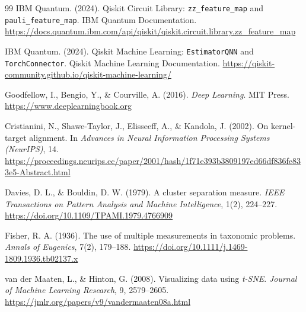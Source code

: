 \begin{thebibliography}{99}
    IBM Quantum. (2024). Qiskit Circuit Library: \texttt{zz\_feature\_map} and \texttt{pauli\_feature\_map}. IBM Quantum Documentation. \url{https://docs.quantum.ibm.com/api/qiskit/qiskit.circuit.library.zz_feature_map}

    IBM Quantum. (2024). Qiskit Machine Learning: \texttt{EstimatorQNN} and \texttt{TorchConnector}. Qiskit Machine Learning Documentation. \url{https://qiskit-community.github.io/qiskit-machine-learning/}

    Goodfellow, I., Bengio, Y., \& Courville, A. (2016). \textit{Deep Learning}. MIT Press.
    \url{https://www.deeplearningbook.org}

    Cristianini, N., Shawe-Taylor, J., Elisseeff, A., \& Kandola, J. (2002). On kernel-target alignment.
    In \textit{Advances in Neural Information Processing Systems (NeurIPS)}, 14.
    \url{https://proceedings.neurips.cc/paper/2001/hash/1f71e393b3809197ed66df836fe833e5-Abstract.html}

    Davies, D. L., \& Bouldin, D. W. (1979). A cluster separation measure.
    \textit{IEEE Transactions on Pattern Analysis and Machine Intelligence}, 1(2), 224--227.
    \url{https://doi.org/10.1109/TPAMI.1979.4766909}

    Fisher, R. A. (1936). The use of multiple measurements in taxonomic problems.
    \textit{Annals of Eugenics}, 7(2), 179--188.
    \url{https://doi.org/10.1111/j.1469-1809.1936.tb02137.x}

    van der Maaten, L., \& Hinton, G. (2008). Visualizing data using \textit{t-SNE}.
    \textit{Journal of Machine Learning Research}, 9, 2579--2605.
    \url{https://jmlr.org/papers/v9/vandermaaten08a.html}



\end{thebibliography}
